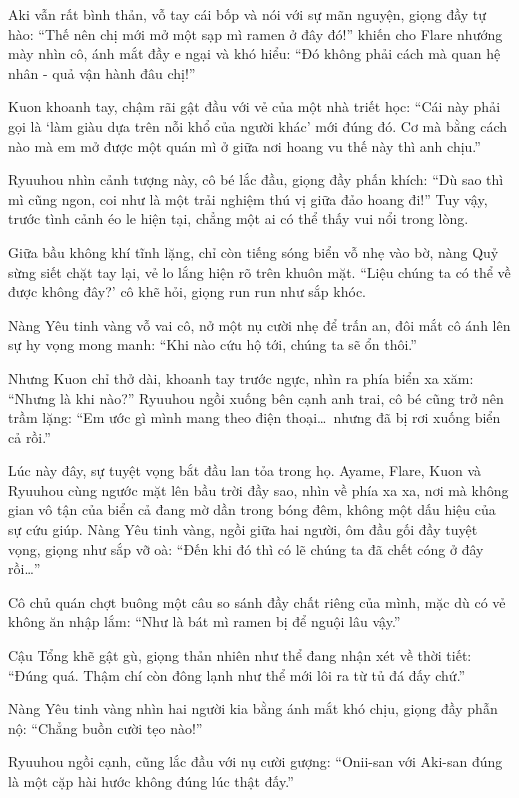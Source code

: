 \documentclass[../main.tex]{subfiles}
\begin{document}
Aki vẫn rất bình thản, vỗ tay cái bốp và nói với sự mãn nguyện, giọng đầy tự hào: ``Thế nên chị mới mở một sạp mì ramen ở đây đó!'' khiến cho Flare nhướng mày nhìn cô, ánh mắt đầy e ngại và khó hiểu: ``Đó không phải cách mà quan hệ nhân - quả vận hành đâu chị!''

Kuon khoanh tay, chậm rãi gật đầu với vẻ của một nhà triết học: ``Cái này phải gọi là `làm giàu dựa trên nỗi khổ của người khác' mới đúng đó. Cơ mà bằng cách nào mà em mở được một quán mì ở giữa nơi hoang vu thế này thì anh chịu.''

Ryuuhou nhìn cảnh tượng này, cô bé lắc đầu, giọng đầy phấn khích: ``Dù sao thì mì cũng ngon, coi như là một trải nghiệm thú vị giữa đảo hoang đi!'' Tuy vậy, trước tình cảnh éo le hiện tại, chẳng một ai có thể thấy vui nổi trong lòng.

Giữa bầu không khí tĩnh lặng, chỉ còn tiếng sóng biển vỗ nhẹ vào bờ, nàng Quỷ sừng siết chặt tay lại, vẻ lo lắng hiện rõ trên khuôn mặt. ``Liệu chúng ta có thể về được không đây?' cô khẽ hỏi, giọng run run như sắp khóc.

Nàng Yêu tinh vàng vỗ vai cô, nở một nụ cười nhẹ để trấn an, đôi mắt cô ánh lên sự hy vọng mong manh: ``Khi nào cứu hộ tới, chúng ta sẽ ổn thôi.''

Nhưng Kuon chỉ thở dài, khoanh tay trước ngực, nhìn ra phía biển xa xăm: ``Nhưng là khi nào?'' Ryuuhou ngồi xuống bên cạnh anh trai, cô bé cũng trở nên trầm lặng: ``Em ước gì mình mang theo điện thoại\dots\ nhưng đã bị rơi xuống biển cả rồi.''

Lúc này đây, sự tuyệt vọng bắt đầu lan tỏa trong họ. Ayame, Flare, Kuon và Ryuuhou cùng ngước mặt lên bầu trời đầy sao, nhìn về phía xa xa, nơi mà không gian vô tận của biển cả đang mờ dần trong bóng đêm, không một dấu hiệu của sự cứu giúp. Nàng Yêu tinh vàng, ngồi giữa hai người, ôm đầu gối đầy tuyệt vọng, giọng như sắp vỡ oà: ``Đến khi đó thì có lẽ chúng ta đã chết cóng ở đây rồi\dots''

Cô chủ quán chợt buông một câu so sánh đầy chất riêng của mình, mặc dù có vẻ không ăn nhập lắm: ``Như là bát mì ramen bị để nguội lâu vậy.''

Cậu Tổng khẽ gật gù, giọng thản nhiên như thể đang nhận xét về thời tiết: ``Đúng quá. Thậm chí còn đông lạnh như thể mới lôi ra từ tủ đá đấy chứ.''

Nàng Yêu tinh vàng nhìn hai người kia bằng ánh mắt khó chịu, giọng đầy phẫn nộ: ``Chẳng buồn cười tẹo nào!''

Ryuuhou ngồi cạnh, cũng lắc đầu với nụ cười gượng: ``Onii-san với Aki-san đúng là một cặp hài hước không đúng lúc thật đấy.''
\end{document}
